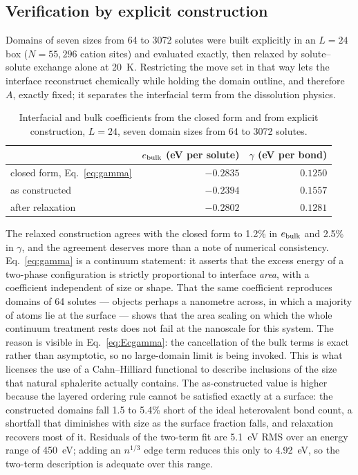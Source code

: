 \documentclass[preprint,12pt,authoryear]{elsarticle}
\begin{document}
\subsection{Verification by explicit construction}
\label{sec:gammaverify}

Domains of seven sizes from 64 to 3072 solutes were built explicitly in an
$L = 24$ box ($N = 55{,}296$ cation sites) and evaluated exactly, then relaxed
by solute--solute exchange alone at 20~K. Restricting the move set in that way
lets the interface reconstruct chemically while holding the domain outline, and
therefore $A$, exactly fixed; it separates the interfacial term from the
dissolution physics.

\begin{table}[htbp]
\centering
\caption{Interfacial and bulk coefficients from the closed form and from
explicit construction, $L = 24$, seven domain sizes from 64 to 3072 solutes.}
\label{tab:gamma}
\small
\begin{tabular}{lrr}
\toprule
& $e_{\rm bulk}$ (eV per solute) & $\gamma$ (eV per bond) \\
\midrule
closed form, Eq.~\eqref{eq:gamma} & $-0.2835$ & $0.1250$ \\
as constructed & $-0.2394$ & $0.1557$ \\
after relaxation & $-0.2802$ & $0.1281$ \\
\bottomrule
\end{tabular}
\end{table}

The relaxed construction agrees with the closed form to 1.2\% in $e_{\rm bulk}$
and 2.5\% in $\gamma$, and the agreement deserves more than a note of numerical
consistency. Eq.~\eqref{eq:gamma} is a continuum statement: it asserts that the
excess energy of a two-phase configuration is strictly proportional to interface
\emph{area}, with a coefficient independent of size or shape. That the same
coefficient reproduces domains of 64 solutes --- objects perhaps a nanometre
across, in which a majority of atoms lie at the surface --- shows that the area
scaling on which the whole continuum treatment rests does not fail at the
nanoscale for this system. The reason is visible in Eq.~\eqref{eq:Ecgamma}: the
cancellation of the bulk terms is exact rather than asymptotic, so no
large-domain limit is being invoked. This is what licenses the use of a
Cahn--Hilliard functional to describe inclusions of the size that natural
sphalerite actually contains. The as-constructed value is higher because the layered
ordering rule cannot be satisfied exactly at a surface: the constructed domains
fall 1.5 to 5.4\% short of the ideal heterovalent bond count, a shortfall that
diminishes with size as the surface fraction falls, and relaxation recovers most
of it. Residuals of the two-term fit are 5.1~eV RMS over an energy range of
450~eV; adding an $n^{1/3}$ edge term reduces this only to 4.92~eV, so the
two-term description is adequate over this range.
\end{document}
